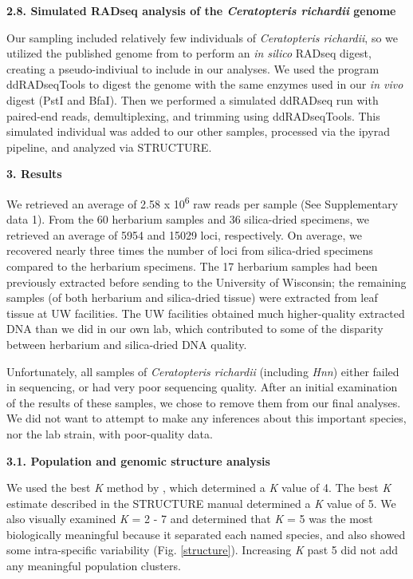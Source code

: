 \documentclass[12pt]{article}
\begin{document}
\begin{flushleft}
\textbf{2.8. Simulated RADseq analysis of the \textit{Ceratopteris richardii} genome}

Our sampling included relatively few individuals of \textit{Ceratopteris richardii}, so we utilized the published genome from \textcite{Marchant2019} to perform an \textit{in silico} RADseq digest, creating a pseudo-indiviual to include in our analyses. We used the program ddRADseqTools \autocite{Mora-Marquez2017} to digest the genome with the same enzymes used in our \textit{in vivo} digest (PstI and BfaI). Then we performed a simulated ddRADseq run with paired-end reads, demultiplexing, and trimming using ddRADseqTools. This simulated individual was added to our other samples, processed via the ipyrad pipeline, and analyzed via STRUCTURE. 

\vspace{1cm}

{\large\textbf{3. Results}}

We retrieved an average of 2.58 x 10\textsuperscript{6} raw reads per sample (See Supplementary data 1). From the 60 herbarium samples and 36 silica-dried specimens, we retrieved an average of 5954 and 15029 loci, respectively. On average, we recovered nearly three times the number of loci from silica-dried specimens compared to the herbarium specimens. The 17 herbarium samples had been previously extracted before sending to the University of Wisconsin; the remaining samples (of both herbarium and silica-dried tissue) were extracted from leaf tissue at UW facilities. The UW facilities obtained much higher-quality extracted DNA than we did in our own lab, which contributed to some of the disparity between herbarium and silica-dried DNA quality.

Unfortunately, all samples of \textit{Ceratopteris richardii} (including \textit{Hnn}) either failed in sequencing, or had very poor sequencing quality. After an initial examination of the results of these samples, we chose to remove them from our final analyses. We did not want to attempt to make any inferences about this important species, nor the lab strain, with poor-quality data. 

\textbf{3.1. Population and genomic structure analysis}

We used the best \textit{K} method by \textcite{Evanno2005}, which determined a \textit{K} value of 4. The best \textit{K} estimate described in the STRUCTURE manual \autocite{Pritchard2000} determined a \textit{K} value of 5. We also visually examined \textit{K} = 2 - 7 and determined that \textit{K} = 5 was the most biologically meaningful because it separated each named species, and also showed some intra-specific variability (Fig. \ref{structure}). Increasing \textit{K} past 5 did not add any meaningful population clusters. 


\end{flushleft}
\end{document}
